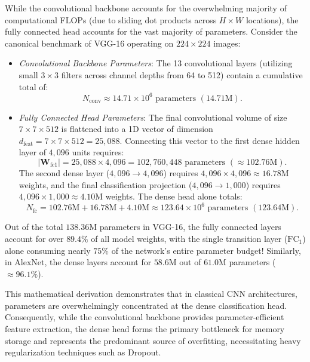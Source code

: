 While the convolutional backbone accounts for the overwhelming majority of computational FLOPs (due to sliding dot products across $H \times W$ locations), the fully connected head accounts for the vast majority of parameters. Consider the canonical benchmark of VGG-16 operating on $224 \times 224$ images:
\begin{itemize}[leftmargin=*]
  \item \textit{Convolutional Backbone Parameters}: The 13 convolutional layers (utilizing small $3 \times 3$ filters across channel depths from 64 to 512) contain a cumulative total of:
    \begin{equation}
    N_{\text{conv}} \approx 14.71 \times 10^6 \text{ parameters } (14.71\text{M}).
    \end{equation}
  \item \textit{Fully Connected Head Parameters}: The final convolutional volume of size $7 \times 7 \times 512$ is flattened into a 1D vector of dimension $d_{\text{feat}} = 7 \times 7 \times 512 = 25,088$. Connecting this vector to the first dense hidden layer of $4,096$ units requires:
    \begin{equation}
    |\mathbf{W}_{\text{fc1}}| = 25,088 \times 4,096 = 102,760,448 \text{ parameters } (\approx 102.76\text{M}).
    \end{equation}
    The second dense layer ($4,096 \to 4,096$) requires $4,096 \times 4,096 \approx 16.78\text{M}$ weights, and the final classification projection ($4,096 \to 1,000$) requires $4,096 \times 1,000 \approx 4.10\text{M}$ weights. The dense head alone totals:
    \begin{equation}
    N_{\text{fc}} = 102.76\text{M} + 16.78\text{M} + 4.10\text{M} \approx 123.64 \times 10^6 \text{ parameters } (123.64\text{M}).
    \end{equation}
\end{itemize}
Out of the total $138.36\text{M}$ parameters in VGG-16, the fully connected layers account for over $\mathbf{89.4\%}$ of all model weights, with the single transition layer ($\text{FC}_1$) alone consuming nearly $75\%$ of the network's entire parameter budget! Similarly, in AlexNet, the dense layers account for $58.6\text{M}$ out of $61.0\text{M}$ parameters ($\approx 96.1\%$). 

This mathematical derivation demonstrates that in classical CNN architectures, parameters are overwhelmingly concentrated at the dense classification head. Consequently, while the convolutional backbone provides parameter-efficient feature extraction, the dense head forms the primary bottleneck for memory storage and represents the predominant source of overfitting, necessitating heavy regularization techniques such as Dropout.

